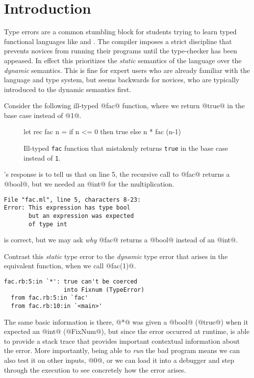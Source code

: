 \section{Introduction}
\label{sec:introduction}

Type errors are a common stumbling block for students trying to learn
typed functional languages like \ocaml and \haskell.
%
The compiler imposes a strict discipline that prevents novices from
running their programs until the type-checker has been appeased.
%
In effect this prioritizes the \emph{static} semantics of the language
over the \emph{dynamic} semantics.
%
This is fine for expert users who are already familiar with the language
and type system, but seems backwards for novices, who are typically
introduced to the dynamic semantics first.

Consider the following ill-typed @fac@ function, where we return
@true@ in the base case instead of @1@.
%
\begin{figure}[h!]
\begin{code}
  let rec fac n =
    if n <= 0 then
      true
    else
      n * fac (n-1)
\end{code}
\caption{Ill-typed \texttt{fac} function that mistakenly
  returns \texttt{true} in the base case instead of \texttt{1}.}
\label{fig:factorial}
\end{figure}

\ocaml's response is to tell us that on line 5, the recursive call to
@fac@ returns a @bool@, but we needed an @int@ for the
multiplication.
%
\begin{verbatim}
File "fac.ml", line 5, characters 8-23:
Error: This expression has type bool
       but an expression was expected
       of type int
\end{verbatim}
%
\ocaml is correct, but we may ask \emph{why} @fac@ returns a
@bool@ instead of an @int@.

Contrast this \emph{static} type error to the \emph{dynamic} type error
that arises in the equivalent \ruby function, when we call
@fac(1)@.
%
\begin{verbatim}
fac.rb:5:in `*': true can't be coerced
                 into Fixnum (TypeError)
  from fac.rb:5:in `fac'
  from fac.rb:10:in `<main>'
\end{verbatim}
%
The same basic information is there, @*@ was given a @bool@ (@true@)
when it expected an @int@ (@FixNum@), but since the error occurred at
runtime, \ruby is able to provide a stack trace that provides important
contextual information about the error.
%
More importantly, being able to \emph{run} the bad program means we can
also test it on other inputs, \eg @0@, or we can load it into a debugger
and step through the execution to see concretely how the error arises.


